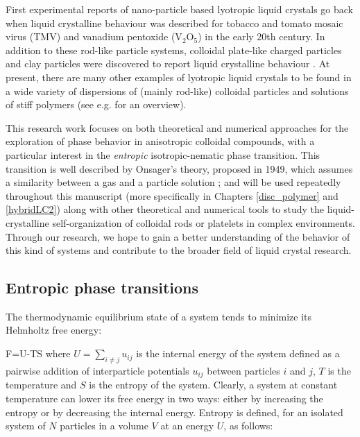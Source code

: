 First experimental reports of nano-particle based lyotropic liquid crystals go back when liquid crystalline behaviour was described for tobacco and tomato mosaic virus (TMV) \cite{Bawden,Bernal} and vanadium pentoxide (V$_{2}$O$_{5}$) \cite{Zocher} in the early 20th century. In addition to these rod-like particle systems, colloidal plate-like charged particles and clay particles were discovered to report liquid crystalline behaviour \cite{Langmuir}. At present, there are many other examples of lyotropic liquid crystals to be found in a wide variety of dispersions of (mainly rod-like) colloidal particles and solutions of stiff polymers (see e.g. \cite{Dierking2020} for an overview).

This research work focuses on both theoretical and numerical approaches for the exploration of phase behavior in anisotropic colloidal compounds, with a particular interest in the {\em entropic} isotropic-nematic phase transition. This transition is well described by Onsager's theory, proposed in 1949, which assumes a similarity between a gas and a particle solution \cite{onsager1949}; and will be used repeatedly throughout this manuscript (more specifically in Chapters \ref{disc_polymer} and \ref{hybridLC2}) along with other theoretical and numerical tools to study the liquid-crystalline self-organization of colloidal rods or platelets in complex environments. Through our research, we hope to gain a better understanding of the behavior of this kind of systems and contribute to the broader field of liquid crystal research.

\subsection{Entropic phase transitions}
\label{entropy_order}

The thermodynamic equilibrium state of a system tends to minimize its Helmholtz free energy:

\beq
F=U-TS
\label{genhelmholtz}
\eeq
where $U = \sum_{i \neq j} u_{ij}$ is the internal energy of the system defined as a pairwise addition of interparticle potentials $u_{ij}$ between particles $i$ and $j$, $T$ is the temperature and $S$ is the entropy of the system. Clearly, a system at constant temperature can lower its free energy in two ways: either by increasing the entropy or by decreasing the internal energy. Entropy is defined, for an isolated system of $N$ particles in a volume $V$ at an energy $U$, as follows:

